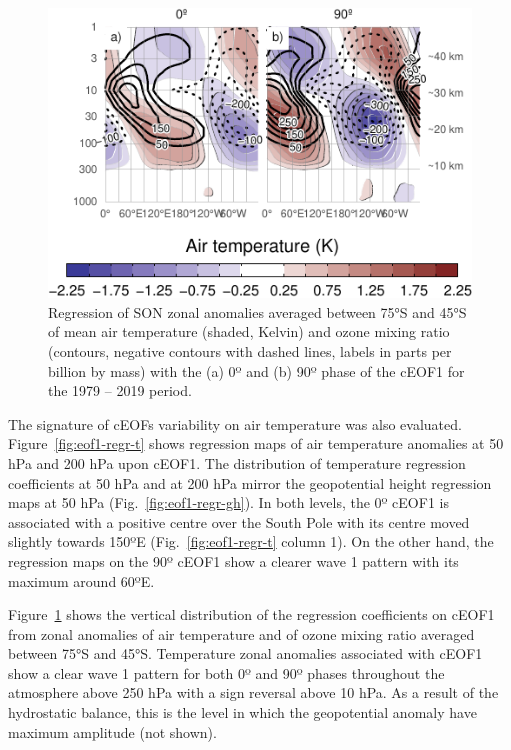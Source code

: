 \documentclass[pdflatex,lineno,sn-basic]{sn-jnl}
\theoremstyle{thmstyleone}%
\theoremstyle{thmstyletwo}%
\theoremstyle{thmstylethree}%
\begin{document}
\begin{figure}
\centering
\includegraphics{shceof_files/figure-latex/t-vertical-1.pdf}
\caption{\label{fig:t-vertical}Regression of SON zonal anomalies averaged between 75°S and 45°S of mean air temperature (shaded, Kelvin) and ozone mixing ratio (contours, negative contours with dashed lines, labels in parts per billion by mass) with the (a) 0º and (b) 90º phase of the cEOF1 for the 1979 -- 2019 period.}
\end{figure}

The signature of cEOFs variability on air temperature was also evaluated.
Figure~\ref{fig:eof1-regr-t} shows regression maps of air temperature anomalies at 50 hPa and 200 hPa upon cEOF1.
The distribution of temperature regression coefficients at 50 hPa and at 200 hPa mirror the geopotential height regression maps at 50 hPa (Fig.~\ref{fig:eof1-regr-gh}).
In both levels, the 0º cEOF1 is associated with a positive centre over the South Pole with its centre moved slightly towards 150ºE (Fig.~\ref{fig:eof1-regr-t} column 1).
On the other hand, the regression maps on the 90º cEOF1 show a clearer wave 1 pattern with its maximum around 60ºE.

Figure~\ref{fig:t-vertical} shows the vertical distribution of the regression coefficients on cEOF1 from zonal anomalies of air temperature and of ozone mixing ratio averaged between 75°S and 45°S.
Temperature zonal anomalies associated with cEOF1 show a clear wave 1 pattern for both 0º and 90º phases throughout the atmosphere above 250 hPa with a sign reversal above 10 hPa.
As a result of the hydrostatic balance, this is the level in which the geopotential anomaly have maximum amplitude (not shown).
\end{document}
